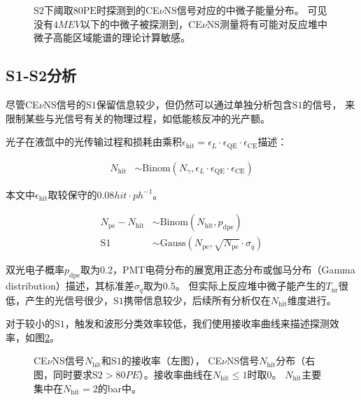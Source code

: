 \begin{figure}
    \centering
    
    \caption{\label{fig:neutrino_efficiency} $\mathrm{S2}$下阈取$80\mathrm{PE}$时探测到的CE$\nu$NS信号对应的中微子能量分布。
    可见没有$4\si{MEV}$以下的中微子被探测到，CE$\nu$NS测量将有可能对反应堆中微子高能区域能谱的理论计算敏感。}
\end{figure}

\subsection{S1-S2分析}

尽管CE$\nu$NS信号的$\mathrm{S1}$保留信息较少，但仍然可以通过单独分析包含$\mathrm{S1}$的信号，
来限制某些与光信号有关的物理过程，如低能核反冲的光产额。

光子在液氙中的光传输过程和损耗由乘积$\epsilon_\mathrm{hit}=\epsilon_L\cdot\epsilon_\mathrm{QE}\cdot\epsilon_\mathrm{CE}$描述：

\begin{align}
    \label{eq:N_hit}
    N_\mathrm{hit} &\sim \mathrm{Binom}\left(N_\gamma,\epsilon_L\cdot\epsilon_\mathrm{QE}\cdot\epsilon_\mathrm{CE}\right)
\end{align}

本文中$\epsilon_\mathrm{hit}$取较保守的$0.08\si{hit\cdot ph^{-1}}$。

\begin{align}
    \label{eq:N_peS1}
    N_\mathrm{pe} - N_\mathrm{hit} &\sim \mathrm{Binom}\left(N_\mathrm{hit},p_\mathrm{dpe}\right) \\
    \mathrm{S1} &\sim \mathrm{Gauss}\left(N_\mathrm{pe},\sqrt{N_\mathrm{pe}}\cdot\sigma_q\right)
\end{align}

双光电子概率$p_\mathrm{dpe}$取为0.2，PMT电荷分布的展宽用正态分布或伽马分布（Gamma distribution）描述，其标准差$\sigma_q$取为0.5。
但实际上反应堆中微子能产生的$T_\mathrm{nr}$很低，产生的光信号很少，$\mathrm{S1}$携带信息较少，后续所有分析仅在$N_\mathrm{hit}$维度进行。

对于较小的$\mathrm{S1}$，触发和波形分类效率较低，我们使用接收率曲线来描述探测效率，如图\ref{fig:s1_hits_pe}。

\begin{figure}
    \centering
    
    \caption{\label{fig:s1_hits_pe} CE$\nu$NS信号$N_\mathrm{hit}$和$\mathrm{S1}$的接收率（左图），
    CE$\nu$NS信号$N_\mathrm{hit}$分布（右图，同时要求$\mathrm{S2}>80\si{PE}$）。接收率曲线在$N_\mathrm{hit}\le1$时取0。
    $N_\mathrm{hit}$主要集中在$N_\mathrm{hit}=2$的bar中。}
\end{figure}


